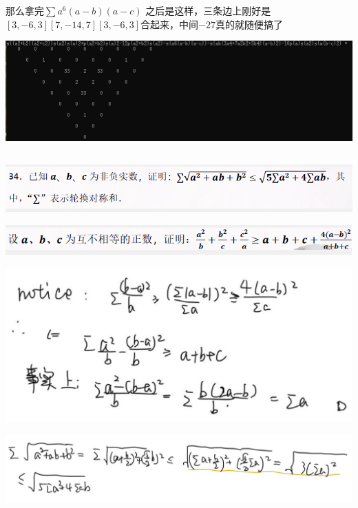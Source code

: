 \documentclass[UTF8]{ctexart}
\begin{document}
那么拿完$  \displaystyle \sum a^{6}(a-b)(a-c) $ 之后是这样，三条边上刚好是$ [3,-6,3][7,-14,7][3,-6,3] $合起来，中间$ -27 $真的就随便搞了
\begin{center}
	\includegraphics[width=0.9\linewidth]{a05}
\end{center}
\subsection{}
\begin{center}
	\includegraphics[width=0.7\linewidth]{a06}
\end{center}
\begin{center}
	\includegraphics[width=0.7\linewidth]{a07}
\end{center}
\begin{center}
	\includegraphics[width=0.7\linewidth]{a08}
\end{center}
\begin{center}
	\includegraphics[width=0.7\linewidth]{a09}
\end{center}
\end{document}
